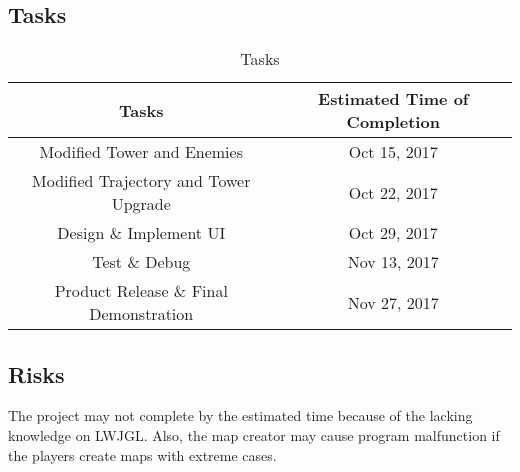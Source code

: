 \documentclass[12pt]{article}
\begin{document}
\subsection{Tasks}
\begin{center}
\begin{table}[!hpb]
    \begin{tabular}{|c|c|}
	\hline
	Tasks & Estimated Time of Completion \\ \hline
	Modified Tower and Enemies  & Oct 15, 2017 \\ \hline
	Modified Trajectory and Tower Upgrade & Oct 22, 2017 \\ \hline
	Design \& Implement UI & Oct 29, 2017 \\ \hline
	Test \& Debug & Nov 13, 2017 \\ \hline
	Product Release \& Final Demonstration & Nov 27, 2017 \\ \hline
    \end{tabular}
    \caption{Tasks} 
\end{table}
\end{center}



\subsection{Risks}
The project may not complete by the estimated time because of the lacking knowledge on LWJGL. Also, the map creator may cause program malfunction if the players create maps with extreme cases.
\end{document}
